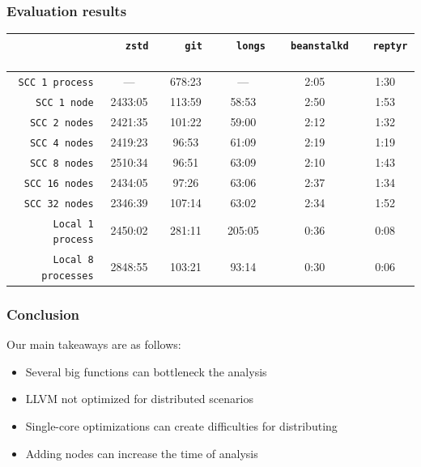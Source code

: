 \begin{frame}
\frametitle{Evaluation results}
\begin{table}[tbh]
\centering
\label{table:projects}
\begin{adjustbox}{width=110mm}
\begin{tabular}{|r|c|c|c|c|c|}
\hline
\           & $\quad$    \texttt{zstd}       $\quad$
            & $\quad$    \texttt{git}        $\quad$
            & $\quad$    \texttt{longs}      $\quad$
            & $\enspace$ \texttt{beanstalkd} $\enspace$
            & $\enspace$ \texttt{reptyr}     $\enspace$ \\ \hline

\texttt{SCC 1 process}
& ---     & 678:23   & ---    & 2:05 & 1:30 \\ \hline
\texttt{SCC 1 node}
& 2433:05 & 113:59   & 58:53  & 2:50 & 1:53 \\ \hline
\texttt{SCC 2 nodes}
& 2421:35 & 101:22   & 59:00  & 2:12 & 1:32 \\ \hline
\texttt{SCC 4 nodes}
& 2419:23 & 96:53    & 61:09  & 2:19 & 1:19 \\ \hline
\texttt{SCC 8 nodes}
& 2510:34 & 96:51    & 63:09  & 2:10 & 1:43 \\ \hline
\texttt{SCC 16 nodes}
& 2434:05 & 97:26    & 63:06  & 2:37 & 1:34 \\ \hline
\texttt{SCC 32 nodes}
& 2346:39 & 107:14   & 63:02  & 2:34 & 1:52 \\ \hline \hline
\texttt{Local 1 process}
& 2450:02 & 281:11   & 205:05 & 0:36 & 0:08 \\ \hline
\texttt{Local 8 processes}
& 2848:55 & 103:21   & 93:14  & 0:30 & 0:06 \\ \hline
\end{tabular}
\end{adjustbox}
\end{table}
\end{frame}


\begin{frame}
\frametitle{Conclusion}
Our main takeaways are as follows:
	\begin{itemize}
		\item Several big functions can bottleneck the analysis
		\item LLVM not optimized for distributed scenarios
		\item Single-core optimizations can create difficulties for distributing
		\item Adding nodes can increase the time of analysis
	\end{itemize}
\end{frame}

